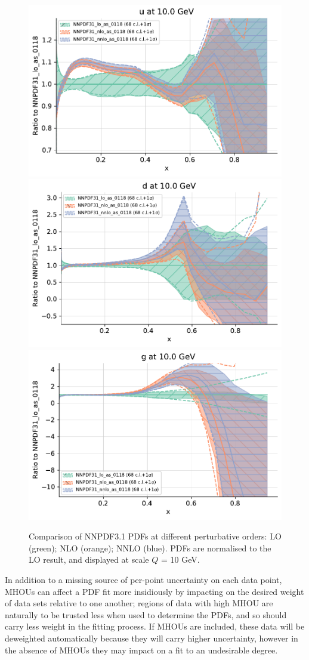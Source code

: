 \begin{figure}[!t]
\centering
\includegraphics[width=0.49\linewidth]{mhous/plots/pdfscalespecs1_basespecs0_pdfnormalize1_plot_pdfs_u.pdf}
\includegraphics[width=0.49\linewidth]{mhous/plots/pdfscalespecs1_basespecs0_pdfnormalize1_plot_pdfs_d.pdf}\\
\includegraphics[width=0.49\linewidth]{mhous/plots/pdfscalespecs1_basespecs0_pdfnormalize1_plot_pdfs_g.pdf}
\caption{Comparison of NNPDF3.1 PDFs at different perturbative orders: LO (green); NLO (orange); NNLO (blue). PDFs are normalised to the LO result, and displayed at scale $Q$ = 10 GeV.}
\label{fig:pdf_order_comp}
\end{figure}

In addition to a missing source of per-point uncertainty on each data point, MHOUs can affect a PDF fit more insidiously by impacting on the desired weight of data sets relative to one another; regions of data with high MHOU are naturally to be trusted less when used to determine the PDFs, and so should carry less weight in the fitting process. If MHOUs are included, these data will be deweighted automatically because they will carry higher uncertainty, however in the absence of MHOUs they may impact on a fit to an undesirable degree.


